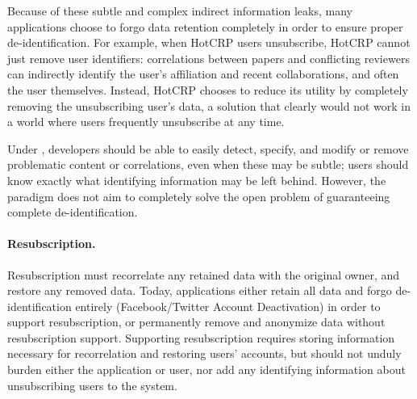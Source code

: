 Because of these subtle and complex indirect information leaks, many applications choose to forgo
data retention completely in order to ensure proper de-identification. For example, when HotCRP
users unsubscribe, 
HotCRP cannot just remove user identifiers: correlations between papers and conflicting  reviewers
can indirectly identify the user's affiliation and recent collaborations, and often the user
themselves. Instead, HotCRP chooses to reduce its utility by completely removing the unsubscribing
user's data, a solution that clearly would not work in a world where users frequently unsubscribe at
any time.

Under \name, developers should be able to easily detect, specify, and modify or remove problematic
content or correlations, even when these may be subtle; users should know exactly what identifying
information may be left behind. However, the \name paradigm does not aim to completely solve the open
problem of guaranteeing complete de-identification.

\paragraph{Resubscription.}
Resubscription must recorrelate any retained data with the original owner, and restore any removed
data. Today, applications either retain all data and forgo de-identification entirely
(Facebook/Twitter Account Deactivation) in order to support resubscription, or permanently remove
and anonymize data without resubscription support. Supporting resubscription requires storing
information necessary for recorrelation and restoring users' accounts, but should not unduly burden
either the application or user, nor add any identifying information about unsubscribing users to the
system.

%


